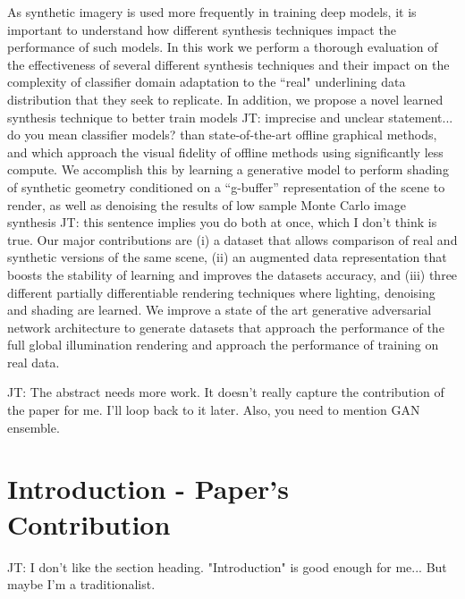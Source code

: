 \documentclass[10pt,twocolumn,letterpaper]{article}
\newcommand{\tompson}[1]{{\color{green} JT: #1}}
\begin{document}
As synthetic imagery is used more frequently in training deep models, it is important to understand how different synthesis techniques impact the performance of such models. In this work we perform a thorough evaluation of the effectiveness of several different synthesis techniques and their impact on the complexity of classifier domain adaptation to the ``real" underlining data distribution that they seek to replicate. In addition, we propose a novel learned synthesis technique to better train models \tompson{imprecise and unclear statement... do you mean classifier models?} than state-of-the-art offline graphical methods, and which approach the visual fidelity of offline methods using significantly less compute.  We accomplish this by learning a generative model to perform shading of synthetic geometry conditioned on a ``g-buffer'' representation of the scene to render, as well as denoising the results of low sample Monte Carlo image synthesis \tompson{this sentence implies you do both at once, which I don't think is true}. Our major contributions are (i) a dataset that allows comparison of real and synthetic versions of the same scene, (ii) an augmented data representation that boosts the stability of learning and improves the datasets accuracy, and (iii) three different partially differentiable rendering techniques where lighting, denoising and shading are learned. We improve a state of the art generative adversarial network architecture to generate datasets that approach the performance of the full global illumination rendering and approach the performance of training on real data.

\tompson{The abstract needs more work. It doesn't really capture the contribution of the paper for me. I'll loop back to it later. Also, you need to mention GAN ensemble.}

\section{Introduction - Paper's Contribution}

\tompson{I don't like the section heading. "Introduction" is good enough for me... But maybe I'm a traditionalist.}
\end{document}
